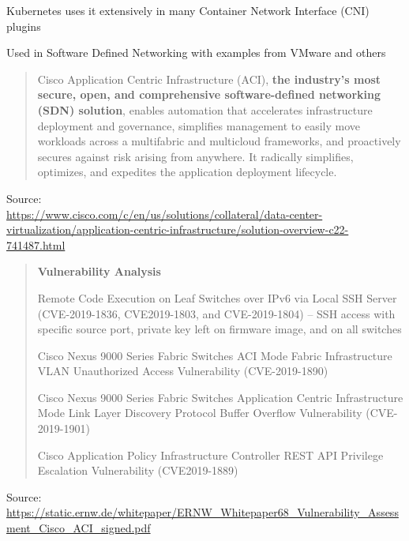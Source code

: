 \documentclass[Screen16to9,17pt]{foils}
\begin{document}


\begin{list2}
\item Kubernetes uses it extensively in many Container Network Interface (CNI) plugins
\item Used in Software Defined Networking with examples from VMware and others
\end{list2}

\begin{quote}
Cisco Application Centric Infrastructure (ACI), {\bf the industry’s most secure, open, and comprehensive software-defined networking (SDN) solution}, enables automation that accelerates infrastructure deployment and governance, simplifies management to easily move workloads across a multifabric and multicloud frameworks, and proactively secures against risk arising from anywhere. It radically simplifies, optimizes, and expedites the application deployment lifecycle.
\end{quote}
Source:\\ {\scriptsize\url{https://www.cisco.com/c/en/us/solutions/collateral/data-center-virtualization/application-centric-infrastructure/solution-overview-c22-741487.html}}



\begin{quote}{\bf
Vulnerability Analysis}
\begin{list2}
\item Remote Code Execution on Leaf Switches over IPv6 via Local SSH Server (CVE-2019-1836, CVE2019-1803, and CVE-2019-1804) -- SSH access with specific source port, private key left on firmware image, and on all switches
\item Cisco Nexus 9000 Series Fabric Switches ACI Mode Fabric Infrastructure VLAN Unauthorized Access
Vulnerability (CVE-2019-1890)
\item Cisco Nexus 9000 Series Fabric Switches Application Centric Infrastructure Mode Link Layer Discovery
Protocol Buffer Overflow Vulnerability (CVE-2019-1901)
\item Cisco Application Policy Infrastructure Controller REST API Privilege Escalation Vulnerability (CVE2019-1889)
\end{list2}
\end{quote}
Source:\\
\url{https://static.ernw.de/whitepaper/ERNW_Whitepaper68_Vulnerability_Assessment_Cisco_ACI_signed.pdf}
\end{document}
